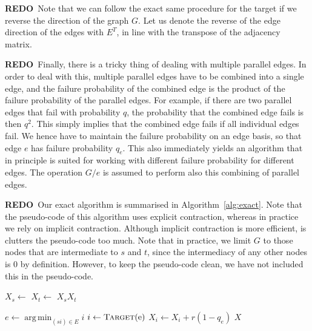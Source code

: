 \documentclass{article}
\theoremstyle{definition}
\DeclareMathOperator*{\argmin}{arg\,min}
\newcommand{\redo}[1]{{\bf\color{orange}REDO}~{\color{blue}#1}}
\begin{document}
\redo{Note that we can follow the exact same procedure for the target if we reverse the direction of the graph $G$.
Let us denote the reverse of the edge direction of the edges with $E^T$, in line with the transpose of the adjacency matrix.}

\redo{Finally, there is a tricky thing of dealing with multiple parallel edges.
In order to deal with this, multiple parallel edges have to be combined into a single edge, and the failure probability of the combined edge is the product of the failure probability of the parallel edges.
For example, if there are two parallel edges that fail with probability $q$, the probability that the combined edge fails is then $q^2$.
This simply implies that the combined edge fails if all individual edges fail.
We hence have to maintain the failure probability on an edge basis, so that edge $e$ has failure probability $q_e$.
This also immediately yields an algorithm that in principle is suited for working with different failure probability for different edges.
The operation $G/e$ is assumed to perform also this combining of parallel edges.}

\redo{Our exact algorithm is summarised in Algorithm~\ref{alg:exact}.
Note that the pseudo-code of this algorithm uses explicit contraction, whereas in practice we rely on implicit contraction.
Although implicit contraction is more efficient, is clutters the pseudo-code too much.
Note that in practice, we limit $G$ to those nodes that are intermediate to $s$ and $t$, since the intermediacy of any other nodes is $0$ by definition.
However, to keep the pseudo-code clean, we have not included this in the pseudo-code.}

\begin{algorithm}[bt]
  \begin{algorithmic}[1]
      \State $X_{s} \gets $  
      \State $X_{t} \gets $ 
			\State \Return $X_{s} X_{t}$ 
		\EndFunction
		\item[]
		 
			\State $e \gets \argmin_{(s i) \in E} i$ 
			\State $i \gets \Call{Target}{$e$}$
			 
				\State $X_i \gets X_i + r (1 - q_e)$
			\EndIf
			\State {} 
			\State {} 
		\EndIf
		\State \Return $X$
		\EndFunction
	\end{algorithmic}
	\caption{\redo{Exact algorithm for calculating intermediacy.}}
	\label{alg:exact}
\end{algorithm}
\end{document}
